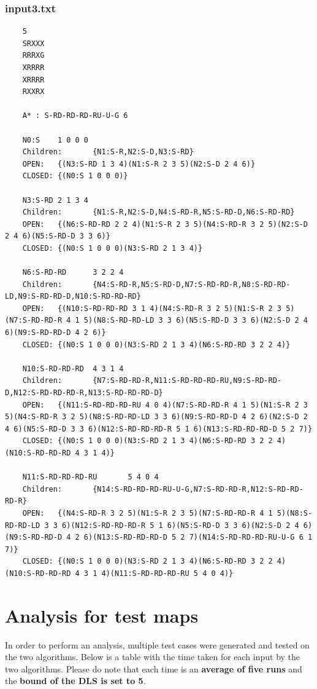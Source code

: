 \documentclass{article}
\begin{document}
	\subsubsection{input3.txt}
	\begin{lstlisting}
	5
	SRXXX
	RRRXG
	XRRRR
	XRRRR
	RXXRX
	
	A* : S-RD-RD-RD-RU-U-G 6
	
	N0:S    1 0 0 0
	Children:       {N1:S-R,N2:S-D,N3:S-RD}
	OPEN:   {(N3:S-RD 1 3 4)(N1:S-R 2 3 5)(N2:S-D 2 4 6)}
	CLOSED: {(N0:S 1 0 0 0)}
	
	N3:S-RD 2 1 3 4
	Children:       {N1:S-R,N2:S-D,N4:S-RD-R,N5:S-RD-D,N6:S-RD-RD}
	OPEN:   {(N6:S-RD-RD 2 2 4)(N1:S-R 2 3 5)(N4:S-RD-R 3 2 5)(N2:S-D 2 4 6)(N5:S-RD-D 3 3 6)}
	CLOSED: {(N0:S 1 0 0 0)(N3:S-RD 2 1 3 4)}
	
	N6:S-RD-RD      3 2 2 4
	Children:       {N4:S-RD-R,N5:S-RD-D,N7:S-RD-RD-R,N8:S-RD-RD-LD,N9:S-RD-RD-D,N10:S-RD-RD-RD}
	OPEN:   {(N10:S-RD-RD-RD 3 1 4)(N4:S-RD-R 3 2 5)(N1:S-R 2 3 5)(N7:S-RD-RD-R 4 1 5)(N8:S-RD-RD-LD 3 3 6)(N5:S-RD-D 3 3 6)(N2:S-D 2 4 6)(N9:S-RD-RD-D 4 2 6)}
	CLOSED: {(N0:S 1 0 0 0)(N3:S-RD 2 1 3 4)(N6:S-RD-RD 3 2 2 4)}
	
	N10:S-RD-RD-RD  4 3 1 4
	Children:       {N7:S-RD-RD-R,N11:S-RD-RD-RD-RU,N9:S-RD-RD-D,N12:S-RD-RD-RD-R,N13:S-RD-RD-RD-D}
	OPEN:   {(N11:S-RD-RD-RD-RU 4 0 4)(N7:S-RD-RD-R 4 1 5)(N1:S-R 2 3 5)(N4:S-RD-R 3 2 5)(N8:S-RD-RD-LD 3 3 6)(N9:S-RD-RD-D 4 2 6)(N2:S-D 2 4 6)(N5:S-RD-D 3 3 6)(N12:S-RD-RD-RD-R 5 1 6)(N13:S-RD-RD-RD-D 5 2 7)}
	CLOSED: {(N0:S 1 0 0 0)(N3:S-RD 2 1 3 4)(N6:S-RD-RD 3 2 2 4)(N10:S-RD-RD-RD 4 3 1 4)}
	
	N11:S-RD-RD-RD-RU       5 4 0 4
	Children:       {N14:S-RD-RD-RD-RU-U-G,N7:S-RD-RD-R,N12:S-RD-RD-RD-R}
	OPEN:   {(N4:S-RD-R 3 2 5)(N1:S-R 2 3 5)(N7:S-RD-RD-R 4 1 5)(N8:S-RD-RD-LD 3 3 6)(N12:S-RD-RD-RD-R 5 1 6)(N5:S-RD-D 3 3 6)(N2:S-D 2 4 6)(N9:S-RD-RD-D 4 2 6)(N13:S-RD-RD-RD-D 5 2 7)(N14:S-RD-RD-RD-RU-U-G 6 1 7)}
	CLOSED: {(N0:S 1 0 0 0)(N3:S-RD 2 1 3 4)(N6:S-RD-RD 3 2 2 4)(N10:S-RD-RD-RD 4 3 1 4)(N11:S-RD-RD-RD-RU 5 4 0 4)}

	\end{lstlisting}
	\newpage
	\section{Analysis for test maps}
	In order to perform an analysis, multiple test cases were generated and tested on the two algorithms. Below is a table with the time taken for each input by the two algorithms. Please do note that each time is an \textbf{average of five runs} and the \textbf{bound of the DLS is set to 5}.
	
\end{document}
